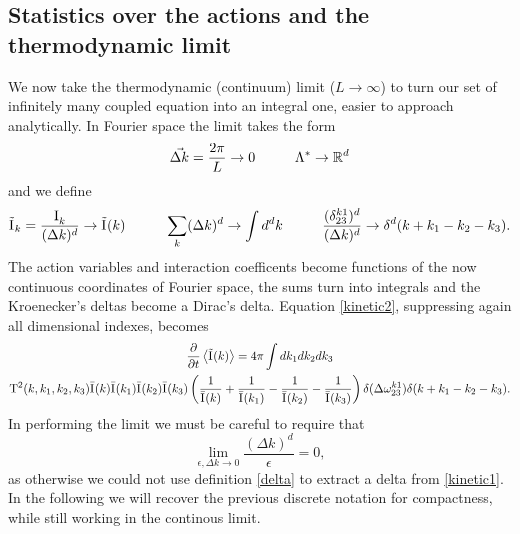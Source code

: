 \subsection{Statistics over the actions and the thermodynamic limit}
We now take the thermodynamic (continuum) limit ($L \rightarrow \infty$) to turn our set of infinitely many coupled equation into an integral one, easier to approach analytically.
In Fourier space the limit takes the form 
\begin{equation}
    \vec{\Delta k} = \frac{2\pi}{L} \rightarrow 0 \hspace{10mm} \Lambda^* \rightarrow \mathbb{R}^d
\end{equation}
and we define 
\begin{equation}
    \tilde{\Ia}_k=\frac{\Ia_k}{(\Delta k)^d} \rightarrow \tilde{\Ia}(k) \hspace{10mm} \sum_k (\Delta k)^d \rightarrow \int d^d k \hspace{10mm} 
    \frac{(\delta^{k1}_{23})^d}{(\Delta k)^d} \rightarrow \delta^d(k + k_1 - k_2 - k_3).
\end{equation}
The action variables and interaction coefficents become functions of the now continuous coordinates of Fourier space, the sums turn into integrals and the Kroenecker's deltas become a
Dirac's delta. Equation \eqref{kinetic2}, suppressing again all dimensional indexes, becomes
\begin{multline}
    \frac{\partial}{\partial t} \left\langle \tilde{\mathrm{I}^{}}(k)\right\rangle = 4 \pi\int dk_1 dk_2 dk_3 \\
    \mathrm{T}^2(k, k_1, k_2, k_3)\bar{\mathrm{I}^{}}(k)\bar{\mathrm{I}^{}}(k_1)\bar{\mathrm{I}^{}}(k_2)\bar{\mathrm{I}^{}}(k_3)
    \left(\frac{1}{\bar{\mathrm{I}^{}}(k)} + \frac{1}{\bar{\mathrm{I}^{}}(k_1)} - \frac{1}{\bar{\mathrm{I}^{}}(k_2)}- \frac{1}{\bar{\mathrm{I}^{}}(k_3)}  \right)
    \delta(\Delta{\omega}^{k1}_{23})\delta(k + k_1 - k_2 - k_3).
    \label{kinetic3}
\end{multline}
In performing the limit we must be careful to require that 
\begin{equation}
\underset{\epsilon, \Delta k \rightarrow 0}{\lim} \frac{(\Delta k)^d}{\epsilon} = 0 ,
\end{equation}
as otherwise we could not use definition \eqref{delta} to extract a delta from \eqref{kinetic1}. \\
In the following we will recover the previous discrete notation for compactness, while still working in the continous limit.\\

